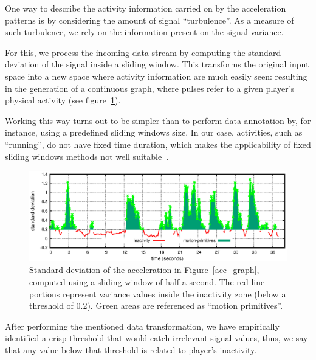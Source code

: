 One way to describe the activity information carried on by the acceleration patterns is by considering the amount of signal ``turbulence''. As a measure of such turbulence, we rely on the information present on the signal variance. 

For this, we process the incoming data stream by computing the standard deviation of the signal inside a sliding window. This transforms the original input space into a new space where activity information are much easily seen: resulting in the generation of a continuous graph, where pulses refer to a given player's physical activity (see figure~\ref{fig:std_graph}). %

Working this way turns out to be simpler than to perform data annotation by, for instance, using a predefined sliding windows size. In our case, activities, such as ``running'', do not have fixed time duration, which makes the applicability of fixed sliding windows methods not well suitable~\cite{noor_adaptive_2016}.

\begin{figure}[H]
      \centering
      \includegraphics[width=\linewidth]{images/04-activity/newStdGraph.eps}
      \caption{Standard deviation of the acceleration in Figure~\ref{acc_graph}, computed using a sliding window of half a second. The red line portions represent variance values inside the inactivity zone (below a threshold of 0.2). Green areas are referenced as ``motion primitives''.}\label{fig:std_graph}
\end{figure}

After performing the mentioned data transformation, we have empirically identified a crisp threshold that would catch irrelevant signal values, thus, we say that any value below that threshold is related to player's inactivity.

